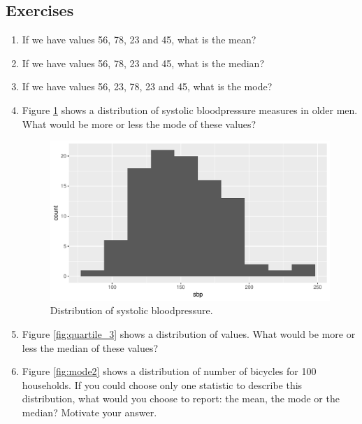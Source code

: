 \documentclass[]{book}\usepackage[]{graphicx}\usepackage[]{color}
\makeatletter
\def\maxwidth{ %
  \ifdim\Gin@nat@width>\linewidth
    \linewidth
  \else
    \Gin@nat@width
  \fi
}
\makeatother
\begin{document}
\subsection{Exercises}

\begin{enumerate}

\item If we have values 56, 78, 23 and 45, what is the mean?

\item If we have values 56, 78, 23 and 45, what is the median?

\item If we have values 56, 23, 78, 23 and 45, what is the mode?

\item Figure \ref{fig:mode} shows a distribution of systolic bloodpressure measures in older men. What would be more or less the mode of these values?

\begin{figure}

{\centering \includegraphics[width=\maxwidth]{figure/mode-1} 

}

\caption[Distribution of systolic bloodpressure]{Distribution of systolic bloodpressure.}\label{fig:mode}
\end{figure}



\item Figure \ref{fig:quartile_3} shows a distribution of values. What would be more or less the median of these values?

\item Figure \ref{fig:mode2} shows a distribution of number of bicycles for 100 households. If you could choose only one statistic to describe this distribution, what would you choose to report: the mean, the mode or the median? Motivate your answer.


\end{enumerate}
\end{document}
